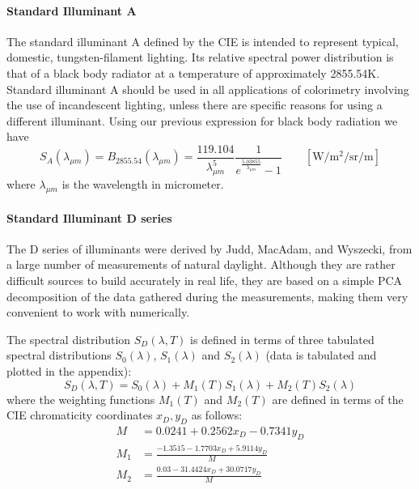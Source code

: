 \paragraph{Standard Illuminant A}

The standard illuminant A defined by the \gls{CIE} is intended to
represent typical, domestic, tungsten-filament lighting.
Its relative spectral power distribution is that of a black body radiator at a
temperature of approximately \num{2855.54}\unit{\kelvin}.
Standard illuminant A should be used in all applications of colorimetry
involving the use of incandescent lighting, unless there are specific reasons
for
using a different illuminant. Using our previous expression for black body radiation we have
\begin{equation}
S_{A}(\lambda_{\mu m}) = B_{2855.54}(\lambda_{\mu m}) =
\frac{119.104}{\lambda_{\mu m}^5} \frac 1{e^{\frac{5.03855}{\lambda_{\mu m}}}-1}
\qquad \left[\unit{\watt\per\square\meter\per\steradian\per\meter}\right]
\end{equation}
where $\lambda_{\mu m}$ is the wavelength in micrometer.

\paragraph{Standard Illuminant D series}

The D series of illuminants were derived by Judd, MacAdam, and Wyszecki, from a
large number of measurements of natural daylight. Although they are rather
difficult sources to build accurately in real life, they are based on a simple
PCA decomposition of the data gathered during the measurements, making them
very convenient to work with numerically.

The spectral distribution $S_D(\lambda, T)$ is defined in terms of three tabulated spectral
distributions $S_0(\lambda)$, $S_1(\lambda)$ and $S_2(\lambda)$ (data is tabulated
and plotted in the appendix):
\begin{equation}
S_D(\lambda, T) = S_0(\lambda) + M_1(T) S_1(\lambda) + M_2(T) S_2(\lambda)
\end{equation}
where the weighting functions $M_1(T)$ and $M_2(T)$ are defined in terms of the
\gls{CIE} chromaticity coordinates $x_D, y_D$ as follows:
\begin{align*}
M   &= 0.0241 + 0.2562 x_D - 0.7341 y_D \\
M_1 &= \frac{-1.3515 - 1.7703 x_D + 5.9114 y_D}{M} \\
M_2 &= \frac{0.03 - 31.4424 x_D + 30.0717 y_D}{M} \\
\end{align*}

